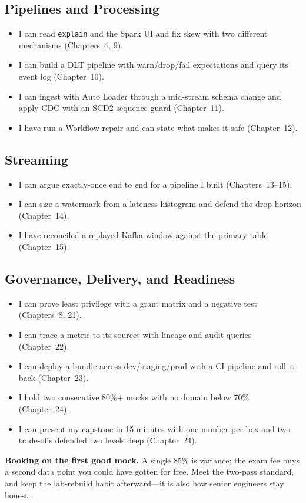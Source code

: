 \subsection*{Pipelines and Processing}
\begin{itemize}
    \item[$\square$] I can read \texttt{explain} and the Spark UI and fix skew with two
    different mechanisms (Chapters~4, 9).
    \item[$\square$] I can build a DLT pipeline with warn/drop/fail expectations and query its
    event log (Chapter~10).
    \item[$\square$] I can ingest with Auto Loader through a mid-stream schema change and apply
    CDC with an SCD2 sequence guard (Chapter~11).
    \item[$\square$] I have run a Workflow repair and can state what makes it safe
    (Chapter~12).
\end{itemize}

\subsection*{Streaming}
\begin{itemize}
    \item[$\square$] I can argue exactly-once end to end for a pipeline I built
    (Chapters~13--15).
    \item[$\square$] I can size a watermark from a lateness histogram and defend the drop
    horizon (Chapter~14).
    \item[$\square$] I have reconciled a replayed Kafka window against the primary table
    (Chapter~15).
\end{itemize}

\subsection*{Governance, Delivery, and Readiness}
\begin{itemize}
    \item[$\square$] I can prove least privilege with a grant matrix and a negative test
    (Chapters~8, 21).
    \item[$\square$] I can trace a metric to its sources with lineage and audit queries
    (Chapter~22).
    \item[$\square$] I can deploy a bundle across dev/staging/prod with a CI pipeline and roll
    it back (Chapter~23).
    \item[$\square$] I hold two consecutive 80\%+ mocks with no domain below 70\%
    (Chapter~24).
    \item[$\square$] I can present my capstone in 15 minutes with one number per box and two
    trade-offs defended two levels deep (Chapter~24).
\end{itemize}

\begin{pitfall}
\textbf{Booking on the first good mock.} A single 85\% is variance; the exam fee buys a
second data point you could have gotten for free. Meet the two-pass standard, and keep the
lab-rebuild habit afterward---it is also how senior engineers stay honest.
\end{pitfall}
